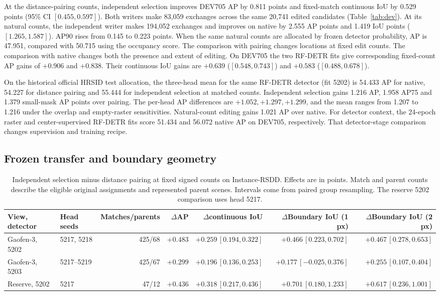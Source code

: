 At the distance-pairing counts, independent selection improves DEV705 AP by 0.811 points and fixed-match continuous IoU by 0.529 points (95\% CI \([0.455,0.597]\)). Both writers make 83,059 exchanges across the same 20,741 edited candidates (Table~\ref{tab:dev}). At its natural counts, the independent writer makes 194,052 exchanges and improves on native by 2.555 AP points and 1.419 IoU points (\([1.265,1.587]\)). AP90 rises from 0.145 to 0.223 points. When the same natural counts are allocated by frozen detector probability, AP is 47.951, compared with 50.715 using the occupancy score. The comparison with pairing changes locations at fixed edit counts. The comparison with native changes both the presence and extent of editing. On DEV705 the two RF-DETR fits give corresponding fixed-count AP gains of \(+0.906\) and \(+0.838\). Their continuous IoU gains are \(+0.639\) (\([0.548,0.743]\)) and \(+0.583\) (\([0.488,0.678]\)).

On the historical official HRSID test allocation, the three-head mean for the same RF-DETR detector (fit 5202) is 54.433 AP for native, 54.227 for distance pairing and 55.444 for independent selection at matched counts. Independent selection gains 1.216 AP, 1.958 AP75 and 1.379 small-mask AP points over pairing. The per-head AP differences are \(+1.052,+1.297,+1.299\), and the mean ranges from 1.207 to 1.216 under the overlap and empty-raster sensitivities. Natural-count editing gains 1.021 AP over native. For detector context, the 24-epoch raster and center-supervised RF-DETR fits score 51.434 and 56.072 native AP on DEV705, respectively. That detector-stage comparison changes supervision and training recipe.

\subsection{Frozen transfer and boundary geometry}
\begin{table}[t]
 \caption{Independent selection minus distance pairing at fixed signed counts on Instance-RSDD. Effects are in points. Match and parent counts describe the eligible original assignments and represented parent scenes. Intervals come from paired group resampling. The reserve 5202 comparison uses head 5217.}
 \label{tab:primary-quant}
 \centering\footnotesize
 \setlength{\tabcolsep}{5pt}
 \begin{tabular}{@{}llrrrrr@{}}
 \toprule
 View, detector & Head seeds & Matches/parents & \(\Delta\)AP & \(\Delta\)continuous IoU & \(\Delta\)Boundary IoU (1 px) & \(\Delta\)Boundary IoU (2 px)\\
 \midrule
 Gaofen-3, 5202 & 5217, 5218 & 425/68 & \(+0.483\) & \(+0.259\,[0.194,0.322]\) & \(+0.466\,[0.223,0.702]\) & \(+0.467\,[0.278,0.653]\)\\
 Gaofen-3, 5203 & 5217--5219 & 425/67 & \(+0.299\) & \(+0.196\,[0.136,0.253]\) & \(+0.177\,[-0.025,0.376]\) & \(+0.255\,[0.107,0.404]\)\\
 Reserve, 5202 & 5217 & 47/12 & \(+0.436\) & \(+0.318\,[0.217,0.436]\) & \(+0.701\,[0.180,1.233]\) & \(+0.617\,[0.236,1.001]\)\\
 \bottomrule
 \end{tabular}
\end{table}

